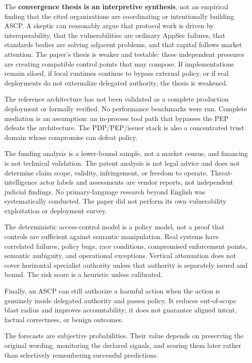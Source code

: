 \documentclass[
  10pt,
  letterpaper,
]{article}
\begin{document}
The \textbf{convergence thesis is an interpretive synthesis}, not an
empirical finding that the cited organizations are coordinating or
intentionally building ASCP. A skeptic can reasonably argue that
protocol work is driven by interoperability, that the vulnerabilities
are ordinary AppSec failures, that standards bodies are solving adjacent
problems, and that capital follows market attention. The paper's thesis
is weaker and testable: these independent pressures are creating
compatible control points that may compose. If implementations remain
siloed, if local runtimes continue to bypass external policy, or if real
deployments do not externalize delegated authority, the thesis is
weakened.

The reference architecture has not been validated as a complete
production deployment or formally verified. No performance benchmarks
were run. Complete mediation is an assumption: an in-process tool path
that bypasses the PEP defeats the architecture. The PDP/PEP/issuer stack
is also a concentrated trust domain whose compromise can defeat policy.

The funding analysis is a lower-bound sample, not a market census, and
financing is not technical validation. The patent analysis is not legal
advice and does not determine claim scope, validity, infringement, or
freedom to operate. Threat-intelligence actor labels and assessments are
vendor reports, not independent judicial findings. No primary-language
research beyond English was systematically conducted. The paper did not
perform its own vulnerability exploitation or deployment survey.

The deterministic access-control model is a policy model, not a proof
that controls are sufficient against semantic manipulation. Real systems
have correlated failures, policy bugs, race conditions, compromised
enforcement points, semantic ambiguity, and operational exceptions.
Vertical attenuation does not cover horizontal specialist authority
unless that authority is separately issued and bound. The risk score is
a heuristic unless calibrated.

Finally, an ASCP can still authorize a harmful action when the action is
genuinely inside delegated authority and passes policy. It reduces
out-of-scope blast radius and improves accountability; it does not
guarantee aligned intent, factual correctness, or benign outcomes.

The forecasts are subjective probabilities. Their value depends on
preserving the original wording, monitoring the declared signals, and
scoring them later rather than selectively remembering successful
predictions.
\end{document}
